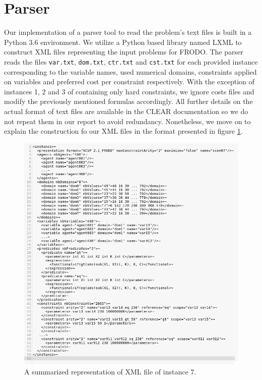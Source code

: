 \documentclass{article}
\begin{document}
	\section{Parser}
	Our implementation of a parser tool to read the problem's text files is built in a Python 3.6 environment. We utilize a Python based library named LXML\cite{lxml} to construct XML files representing the input problems for FRODO. The parser reads the files \texttt{var.txt}, \texttt{dom.txt}, \texttt{ctr.txt} and \texttt{cst.txt} for each provided instance corresponding to the variable names, used numerical domains, constraints applied on variables and preferred cost per constraint respectively. With the exception of instances 1, 2 and 3 of containing only hard constraints, we ignore costs files and modify the previously mentioned formulas accordingly. All further details on the actual format of text files are available in the CLEAR documentation so we do not repeat them in our report to avoid redundancy. Nonetheless, we move on to explain the construction fo our XML files in the format presented in figure \ref{file_format}.
	\begin{figure}
		\centering
		\includegraphics[scale=0.5]{figure/xml.png}
		\caption{A summarized representation of XML file of instance 7.}
		\label{file_format}
	\end{figure}
\end{document}
